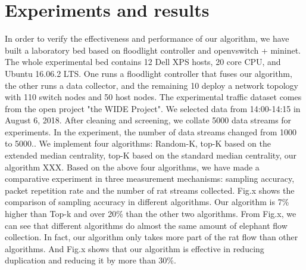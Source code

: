 \documentclass[conference]{IEEEtran}
\begin{document}
\section{Experiments and results}
In order to verify the effectiveness and performance of our algorithm, we have built a laboratory bed based on floodlight controller and openvswitch + mininet. The whole experimental bed contains 12 Dell XPS hosts, 20 core CPU, and Ubuntu 16.06.2 LTS. One runs a floodlight controller that fuses our algorithm, the other runs a data collector, and the remaining 10 deploy a network topology with 110 switch nodes and 50 host nodes. The experimental traffic dataset comes from the open project "the WIDE Project". We selected data from 14:00-14:15 in August 6, 2018. After cleaning and screening, we collate 5000 data streams for experiments. In the experiment, the number of data streams changed from 1000 to 5000..
We implement four algorithms: Random-K, top-K based on the extended median centrality, top-K based on the standard median centrality, our algorithm XXX. Based on the above four algorithms, we have made a comparative experiment in three measurement mechanisms: sampling accuracy, packet repetition rate and the number of rat streams collected.
Fig.x shows the comparison of sampling accuracy in different algorithms. Our algorithm is 7\% higher than Top-k and over 20\% than the other two algorithms. From Fig.x, we can see that different algorithms do almost the same amount of elephant flow collection. In fact, our algorithm only takes more part of the rat flow than other algorithms. And Fig.x shows that our algorithm is effective in reducing duplication and reducing it by more than 30\%.
\end{document}
